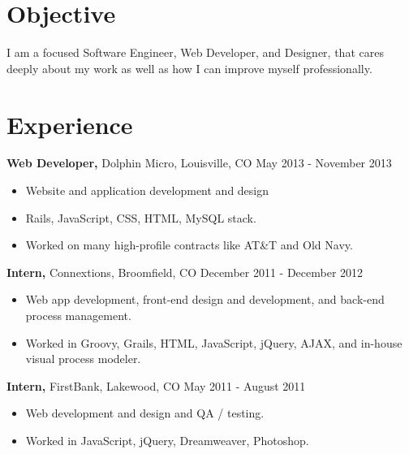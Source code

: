 \documentclass[margin]{res}
\begin{document}
 
 

\address{  mitchell.a.goudy@gmail.com \\ mitchellgoudy.com \\ https://github.com/mgoudy91 \\ }

\address{ (720) 480-7126 \\ 2119 Spruce Street \#3 \\ Boulder, CO 80302 }

 
\begin{resume} 
 
\section{Objective} 
I am a focused Software Engineer, Web Developer, and Designer, that cares deeply about my work as well as how I can improve myself professionally. 

\section{Experience}
 {\bf Web Developer,} Dolphin Micro, Louisville, CO  \hfill May 2013 - November 2013
 \begin{itemize} \itemsep -2pt  %
 \item Website and application development and design
 \item Rails, JavaScript, CSS, HTML, MySQL stack. 
 \item Worked on many high-profile contracts like AT\&T and Old Navy.
 \end{itemize}

{\bf Intern,} Connextions, Broomfield, CO  \hfill December 2011 - December 2012
 \begin{itemize} \itemsep -2pt  %
 \item Web app development, front-end design and development, and back-end process management.
 \item Worked in Groovy, Grails, HTML, JavaScript, jQuery, AJAX, and in-house visual process modeler.
 \end{itemize}

 {\bf Intern,} FirstBank, Lakewood, CO  \hfill May 2011 - August 2011
 \begin{itemize} \itemsep -2pt  %
 \item Web development and design and QA / testing.
 \item Worked in JavaScript, jQuery, Dreamweaver, Photoshop.
 \end{itemize}


\end{resume}
\end{document}
